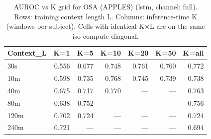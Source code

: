 \begin{table}[ht]
\centering
\caption{AUROC vs K grid for OSA (APPLES) (lstm, channel: full). Rows: training context length L. Columns: inference-time K (windows per subject). Cells with identical K×L are on the same iso-compute diagonal.}
\label{tab:kgrid_osa_binary_apples_postqc_lstm_full}
\begin{tabular}{lrrrrrr}
\toprule
Context_L & K=1 & K=5 & K=10 & K=20 & K=50 & K=all \\
\midrule
30s & 0.556 & 0.677 & 0.748 & 0.761 & 0.760 & 0.772 \\
10m & 0.598 & 0.735 & 0.768 & 0.745 & 0.739 & 0.738 \\
40m & 0.675 & 0.717 & 0.770 & — & — & 0.763 \\
80m & 0.638 & 0.752 & — & — & — & 0.756 \\
120m & 0.702 & 0.724 & — & — & — & 0.724 \\
240m & 0.721 & — & — & — & — & 0.694 \\
\bottomrule
\end{tabular}
\end{table}